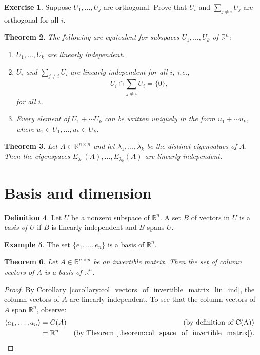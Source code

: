 \documentclass{amsart}
\newcommand{\RR}{\mathbb{R}}
\newtheorem{theorem}{Theorem}[section]
\theoremstyle{definition}
\newtheorem{definition}[theorem]{Definition}
\newtheorem{example}[theorem]{Example}
\newtheorem{exercise}[theorem]{Exercise}
\begin{document}
\begin{exercise}
  Suppose $U_1,\ldots,U_j$ are orthogonal. Prove that $U_i$ and $\sum_{j\neq i}U_j$ are orthogonal for all $i$.
\end{exercise}

\begin{theorem}
  The following are equivalent for subspaces $U_1,\ldots,U_k$ of $\RR^n$:
  \begin{enumerate}
    \item $U_1,\ldots,U_k$ are linearly independent.
    \item $U_i$ and $\sum_{j\neq i} U_i$ are linearly independent for all $i$, i.e.,
  $$
  U_i\cap \sum_{j\neq i} U_i = \{0\},
  $$
  for all $i$.
  \item Every element of $U_1+\cdots U_k$ can be written uniquely in the form $u_1+\cdots u_k$, where $u_1\in U_1,\ldots,u_k\in U_k$.
  \end{enumerate}
\end{theorem}

\begin{theorem}
  Let $A\in\RR^{n\times n}$ and let $\lambda_1,\ldots,\lambda_k$ be the distinct eigenvalues of $A$.
  Then the eigenspaces $E_{\lambda_1}(A),\ldots,E_{\lambda_k}(A)$ are linearly independent.
\end{theorem}

\section{Basis and dimension}

\begin{definition}
  Let $U$ be a nonzero subspace of $\RR^n$.
  A set $B$ of vectors in $U$ is a \emph{basis of $U$} if $B$ is linearly independent and $B$ spans $U$.
\end{definition}

\begin{example}
The set $\{e_1,\ldots,e_n\}$ is a basis of $\RR^n$.
\end{example}

\begin{theorem}
Let $A\in\RR^{n\times n}$ be an invertible matrix. Then the set of column vectors of $A$ is a basis of $\RR^n$.
\end{theorem}
\begin{proof}
By Corollary~\ref{corollary:col_vectors_of_invertible_matrix_lin_ind}, the column vectors of $A$ are linearly independent. To see that the column vectors of $A$ span $\RR^n$, observe:
\begin{align*}
\langle a_1,\ldots,a_n\rangle &= C(A) &\text{(by definition of C(A))}\\
&= \RR^n&\text{(by Theorem~\ref{theorem:col_space_of_invertible_matrix})}.&\qedhere
\end{align*}
\end{proof}
\end{document}
